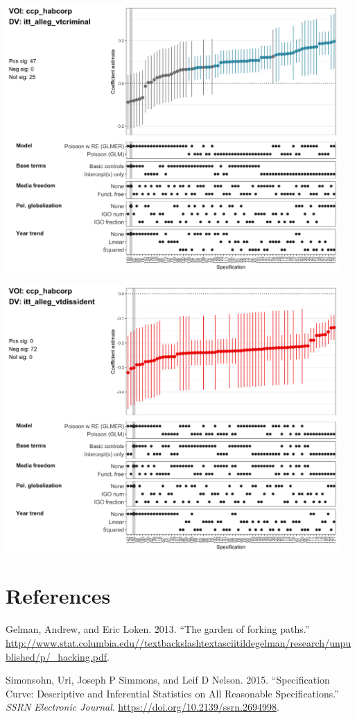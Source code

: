 \documentclass[]{article}
\begin{document}
\includegraphics[height=4in]{../output/figures-robustness/specplot-ccp_habcorp-itt_alleg_vtcriminal.png}

\includegraphics[height=4in]{../output/figures-robustness/specplot-ccp_habcorp-itt_alleg_vtdissident.png}

\hypertarget{references}{%
\section*{References}\label{references}}

\hypertarget{refs}{}
\leavevmode\hypertarget{ref-gelman2013garden}{}%
Gelman, Andrew, and Eric Loken. 2013. ``The garden of forking paths.''
\url{http://www.stat.columbia.edu//textbackslashtextasciitildegelman/research/unpublished/p/_hacking.pdf}.

\leavevmode\hypertarget{ref-simonsohn2015specification}{}%
Simonsohn, Uri, Joseph P Simmons, and Leif D Nelson. 2015.
``Specification Curve: Descriptive and Inferential Statistics on All
Reasonable Specifications.'' \emph{SSRN Electronic Journal}.
\url{https://doi.org/10.2139/ssrn.2694998}.
\end{document}

